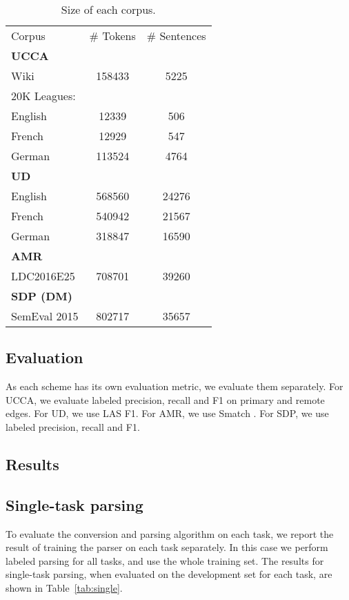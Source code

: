 \documentclass[11pt,a4paper]{article}
\begin{document}
\begin{table}
\begin{tabular}{lcc}
Corpus & \# Tokens & \# Sentences \\
\textbf{UCCA} \\
Wiki & 158433 & 5225 \\
20K Leagues: \\
English & 12339 & 506 \\
French & 12929 & 547 \\
German & 113524 & 4764 \\
\textbf{UD} \\
English & 568560 & 24276 \\
French & 540942 & 21567 \\
German & 318847 & 16590 \\
\textbf{AMR} \\
LDC2016E25 & 708701 & 39260 \\
\textbf{SDP \small(DM)} \\
SemEval 2015 & 802717 & 35657 \\
\end{tabular}
\caption{Size of each corpus.\label{tab:corpora}}
\end{table}


\subsection{Evaluation}\label{sec:evaluation}

As each scheme has its own evaluation metric, we evaluate them separately.
For UCCA, we evaluate labeled precision, recall and F1 on primary and remote edges.
For UD, we use LAS F1.
For AMR, we use Smatch \cite{cai2013smatch}.
For SDP, we use labeled precision, recall and F1.


\subsection{Results}\label{sec:results}




\subsection{Single-task parsing}\label{sec:results_single}

To evaluate the conversion and parsing algorithm on each task, we report the result
of training the parser on each task separately.
In this case we perform labeled parsing for all tasks, and use the whole training set.
The results for single-task parsing, when evaluated on the development set for each task,
are shown in Table~\ref{tab:single}.
\end{document}
